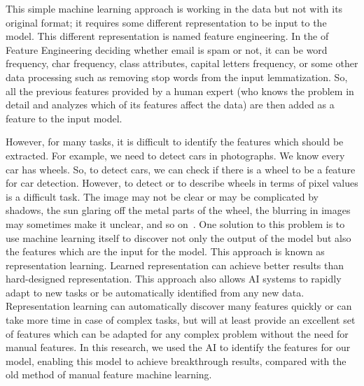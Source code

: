 This simple machine learning approach is working in the data but not with its original format; it requires some different representation to be input to the model. This different representation is named feature engineering. In the of Feature Engineering deciding whether email is spam or not, it can be word frequency, char frequency, class attributes, capital letters frequency, or some other data processing such as removing stop words from the input lemmatization. So, all the previous features provided by a human expert (who knows the problem in detail and analyzes which of its features affect the data) are then added as a feature to the input model.
   

However, for many tasks, it is difficult to identify the features which should be extracted. For example, we need to detect cars in photographs. We know every car has wheels. So, to detect cars, we can check if there is a wheel to be a feature for car detection. However, to detect or to describe wheels in terms of pixel values is a difficult task. The image may not be clear or may be complicated by shadows, the sun glaring off the metal parts of the wheel, the blurring in images may sometimes make it unclear, and so on~\cite{Goodfellow-et-al-2016}. One solution to this problem is to use machine learning itself to discover not only the output of the model but also the features which are the input for the model. This approach is known as representation learning. Learned representation can achieve better results than hard-designed representation. This approach also allows AI systems to rapidly adapt to new tasks or be automatically identified from any new data. Representation learning can automatically discover many features quickly or can take more time in case of complex tasks, but will at least provide an excellent set of features which can be adapted for any complex problem without the need for manual features. In this research, we used the AI to identify the features for our model, enabling this model to achieve breakthrough results, compared with the old method of manual feature machine learning.

